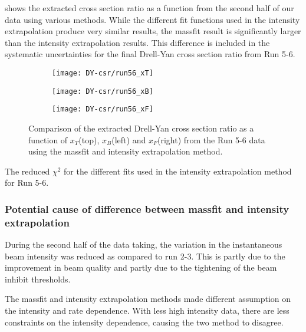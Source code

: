 \documentclass[../main.tex]{subfiles}
\begin{document}
 shows the extracted cross section ratio as a function from the
second half of our data using various methods. While the different fit functions used in the
intensity extrapolation produce very similar results, the massfit result is significantly larger
than the intensity extrapolation results. This difference is included in the systematic uncertainties
for the final Drell-Yan cross section ratio from Run 5-6.
\begin{figure}[h!]
	\centering
	\begin{subfigure}{0.6\linewidth}
		\texttt{[image: DY-csr/run56\_xT]}
	\end{subfigure}
	\begin{subfigure}{0.45\linewidth}
		\texttt{[image: DY-csr/run56\_xB]}
	\end{subfigure}
	\begin{subfigure}{0.45\linewidth}
		\texttt{[image: DY-csr/run56\_xF]}
	\end{subfigure}
	\caption{Comparison of the extracted Drell-Yan cross section ratio as a function of $x_T$(top),  $x_B$(left)
		and $x_F$(right) from the Run 5-6 data using the massfit and intensity extrapolation method.}
	\label{fig:CSR_Run5-6}
\end{figure}
\begin{table}
	\centering
	\caption{The reduced $\chi^2$ for the different fits used in the intensity extrapolation method for Run 5-6. }
	\label{tab:chi_run56}
	
\end{table}

\subsubsection{Potential cause of difference between massfit and intensity extrapolation}
During the second half of the data taking, the variation in the instantaneous beam
intensity was reduced as compared to run 2-3. This is partly due to the improvement
in beam quality and partly due to the tightening of the beam inhibit thresholds.

The massfit and intensity extrapolation methods made different assumption on the intensity
and rate dependence. With less high intensity data, there are less constraints on the
intensity dependence, causing the two method to disagree.
\end{document}
